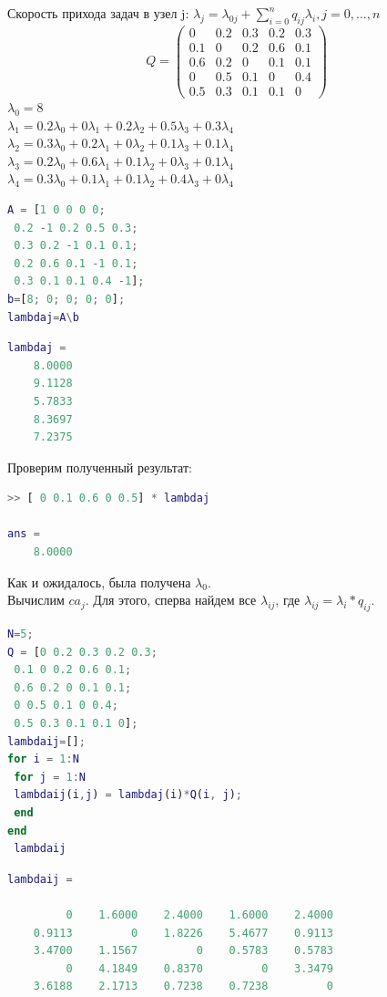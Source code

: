 Скорость прихода задач в узел j: $\lambda_j=\lambda_{0j}+\sum_{i=0}^nq_{ij}\lambda_i, j=0, ..., n$
\begin{equation*}
Q =
 \begin{pmatrix}
  0& 0.2& 0.3& 0.2& 0.3 \\
  0.1&0&0.2&0.6&0.1 \\
  0.6&0.2&0&0.1&0.1  \\
  0&0.5&0.1&0&0.4 \\
  0.5&0.3&0.1&0.1&0
 \end{pmatrix}
\end{equation*}
$\lambda_0=8$\\
$\lambda_1=0.2\lambda_0+0\lambda_1+0.2\lambda_2+0.5\lambda_3+0.3\lambda_4$\\
$\lambda_2=0.3\lambda_0+0.2\lambda_1+0\lambda_2+0.1\lambda_3+0.1\lambda_4$\\
$\lambda_3=0.2\lambda_0+0.6\lambda_1+0.1\lambda_2+0\lambda_3+0.1\lambda_4$\\
$\lambda_4=0.3\lambda_0+0.1\lambda_1+0.1\lambda_2+0.4\lambda_3+0\lambda_4$
\begin{lstlisting}[language={matlab}, caption={Код Matlab}, basicstyle=\ttfamily]
A = [1 0 0 0 0;
 0.2 -1 0.2 0.5 0.3;
 0.3 0.2 -1 0.1 0.1;
 0.2 0.6 0.1 -1 0.1;
 0.3 0.1 0.1 0.4 -1];
b=[8; 0; 0; 0; 0];
lambdaj=A\b
\end{lstlisting}
\begin{lstlisting}[language={matlab}, caption={Результат}, basicstyle=\ttfamily]
lambdaj =
    8.0000
    9.1128
    5.7833
    8.3697
    7.2375
\end{lstlisting}
Проверим полученный результат:
\begin{lstlisting}[language={matlab}, caption={Проверка}, basicstyle=\ttfamily]
>> [ 0 0.1 0.6 0 0.5] * lambdaj

ans =
    8.0000 
\end{lstlisting}
Как и ожидалось, была получена $\lambda_0$.\\Вычислим $ca_j$. Для этого, сперва найдем все $\lambda_{ij}$, где $\lambda_{ij} = \lambda_i*q_{ij}$.
\begin{lstlisting}[language={matlab}, caption={Код Matlab}, basicstyle=\ttfamily]
N=5;
Q = [0 0.2 0.3 0.2 0.3;
 0.1 0 0.2 0.6 0.1;
 0.6 0.2 0 0.1 0.1;
 0 0.5 0.1 0 0.4;
 0.5 0.3 0.1 0.1 0];
lambdaij=[];
for i = 1:N
 for j = 1:N
 lambdaij(i,j) = lambdaj(i)*Q(i, j);
 end
end
 lambdaij
\end{lstlisting}
\begin{lstlisting}[language={matlab}, caption={Результат}, basicstyle=\ttfamily]
lambdaij =

         0    1.6000    2.4000    1.6000    2.4000
    0.9113         0    1.8226    5.4677    0.9113
    3.4700    1.1567         0    0.5783    0.5783
         0    4.1849    0.8370         0    3.3479
    3.6188    2.1713    0.7238    0.7238         0
\end{lstlisting}

